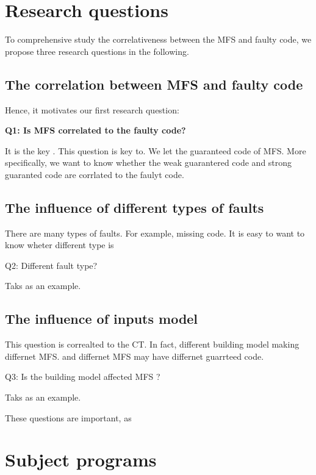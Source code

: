 \documentclass{sig-alternate-05-2015}
\begin{document}



\section{Research questions} \label{sec:research}
To comprehensive study the correlativeness between the MFS and faulty code, we propose three research questions in the following.

\subsection{The correlation between MFS and faulty code}


Hence, it motivates our first research question:

\textbf{Q1: Is MFS correlated to the faulty code?}

It is the key .
This question is key to. We let the guaranteed code of MFS.
More specifically, we want to know whether the weak guarantered code and strong guaranted code are corrlated to the faulyt code.


\subsection{The influence of different types of faults}

There are many types of faults. For example, missing code.  It is easy to want to know wheter different type is 

Q2: Different fault type?

Taks as an example.

\subsection{The influence of inputs model}
This question is correalted to the CT. In fact, different building model making differnet MFS. and differnet MFS may have differnet guarrteed code. 

Q3: Is the building model affected  MFS ?

Taks as an example.


These questions are important, as

\section{Subject programs}\label{sec:subjects}
\end{document}
